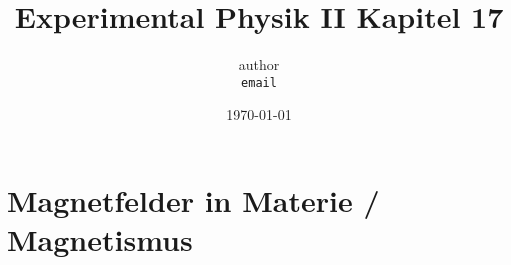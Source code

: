 \documentclass[11pt]{article}
\begin{document}
	\title{Experimental Physik II Kapitel 17}
		\author
			{
				author\\
				{\small 	\texttt{email}}
			}
		\date{\today}
	\maketitle
	\tableofcontents
	\setcounter{section}{16} %
	\newpage
	
\section{Magnetfelder in Materie / Magnetismus}
\end{document}

